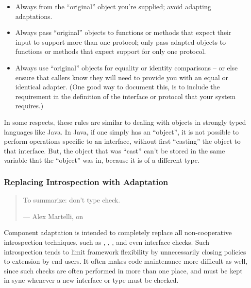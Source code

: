 \begin{verbatim%
}
\begin{verbatim%
}
\begin{itemize}

\item Always  from the ``original'' object you're supplied;
avoid adapting adaptations.

\item Always pass ``original'' objects to functions or methods that expect
their input to support more than one protocol; only pass adapted objects to
functions or methods that expect support for only one protocol.

\item Always use ``original'' objects for equality or identity comparisons --
or else ensure that callers know they will need to provide you with an equal or
identical adapter.  (One good way to document this, is to include the
requirement in the definition of the interface or protocol that your system
requires.)

\end{itemize}

In some respects, these rules are similar to dealing with objects in strongly
typed languages like Java.  In Java, if one simply has an ``object'', it is not
possible to perform operations specific to an interface, without first
``casting'' the object to that interface.  But, the object that was ``cast''
can't be stored in the same variable that the ``object'' was in, because it
is of a different type.


















\subsubsection{Replacing Introspection with Adaptation}

\begin{quotation}
To summarize: don't type check.

\hfill --- Alex Martelli, on 
\end{quotation}

Component adaptation is intended to completely replace all non-cooperative
introspection techniques, such as , ,
, and even interface checks.  Such introspection
tends to limit framework flexibility by unnecessarily closing policies to
extension by end users.  It often makes code maintenance more difficult as
well, since such checks are often performed in more than one place, and
must be kept in sync whenever a new interface or type must be checked.


\end{verbatim%
}
\end{verbatim%
}
